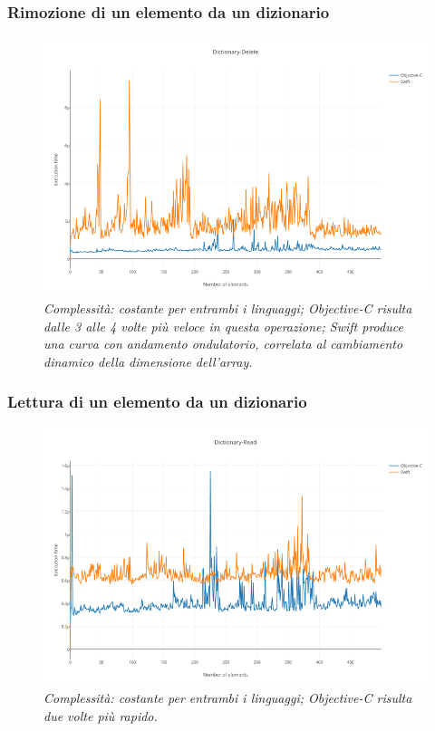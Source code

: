 \subsubsection{Rimozione di un elemento da un dizionario}
\begin{figure}[H]
      \centering
      \includegraphics[scale=0.50]{immagini/dictionary_delete.png}
            \vspace{0.8cm}
            \caption{\textit{Complessità: costante per entrambi i linguaggi; Objective-C risulta dalle 3 alle 4 volte più veloce in questa operazione; Swift produce una curva con andamento ondulatorio, correlata al cambiamento dinamico della dimensione dell'array.}}
\end{figure}
\subsubsection{Lettura di un elemento da un dizionario}
\begin{figure}[H]
      \centering
      \includegraphics[scale=0.50]{immagini/dictionary_read.png}
            \vspace{0.8cm}
            \caption{\textit{Complessità: costante per entrambi i linguaggi; Objective-C risulta due volte più rapido.}}
\end{figure}
